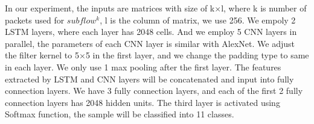 \documentclass[conference]{IEEEtran}
\begin{document}

In our experiment, the inputs are matrices with size of k$\times$l, where k is number of packets used for $subflow^k$, l is the column of matrix, we use 256. We empoly 2 LSTM layers, where each layer has 2048 cells. And we employ 5 CNN layers in parallel, the parameters of each CNN layer is similar with AlexNet. We adjust the filter kernel to 5$\times$5 in the first layer, and we change the padding type to same in each layer. We only use 1 max pooling after the first layer. The features extracted by LSTM and CNN layers will be concatenated and input into fully connection layers. We have 3 fully connection layers, and each of the first 2 fully connection layers has 2048 hidden units. The third layer is activated using Softmax function, the sample will be classified into 11 classes.


\end{document}
